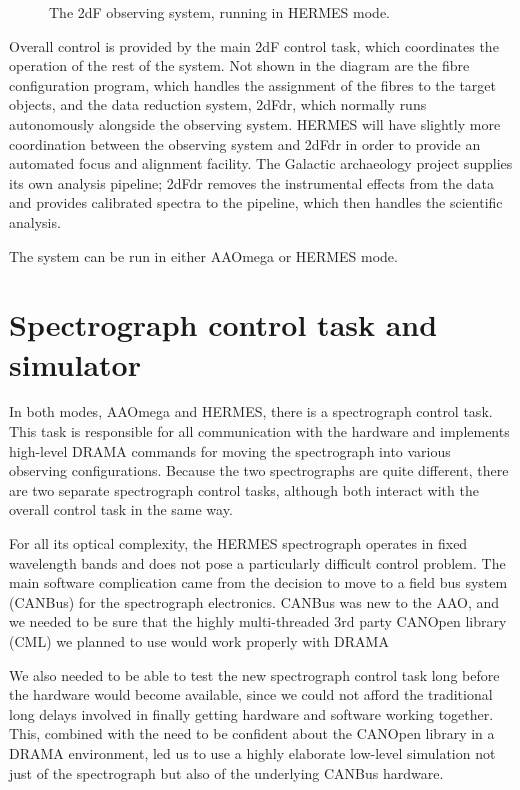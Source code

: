\begin{figure}
\caption{The 2dF observing system, running in HERMES mode.}
\end{figure}

Overall control is provided by the main 2dF control task, which coordinates the operation of the rest of the system. Not shown in the diagram are the fibre configuration program, which handles the assignment of the fibres to the target objects, and the data reduction system, 2dFdr, which normally runs autonomously alongside the observing system. HERMES will have slightly more coordination between the observing system and 2dFdr in order to provide an automated focus and alignment facility. The Galactic archaeology project supplies its own analysis pipeline; 2dFdr removes the instrumental effects from the data and provides calibrated spectra to the pipeline, which then handles the scientific analysis.

The system can be run in either AAOmega or HERMES mode.

\section{Spectrograph control task and simulator}

In both modes, AAOmega and HERMES, there is a spectrograph control task. This task is responsible for all communication with the hardware and implements high-level DRAMA commands for moving the spectrograph into various observing configurations. Because the two spectrographs are quite different, there are two separate spectrograph control tasks, although both interact with the overall control task in the same way.

For all its optical complexity, the HERMES spectrograph operates in fixed wavelength bands and does not pose a particularly difficult control problem. The main software complication came from the decision to move to a field bus system (CANBus) for the spectrograph electronics. CANBus was new to the AAO, and we needed to be sure that the highly multi-threaded 3rd party CANOpen library (CML) we planned to use would work properly with DRAMA

We also needed to be able to test the new spectrograph control task long before the hardware would become available, since we could not afford the traditional long delays involved in finally getting hardware and software working together. This, combined with the need to be confident about the CANOpen library in a DRAMA environment, led us to use a highly elaborate low-level simulation not just of the spectrograph but also of the underlying CANBus hardware.


